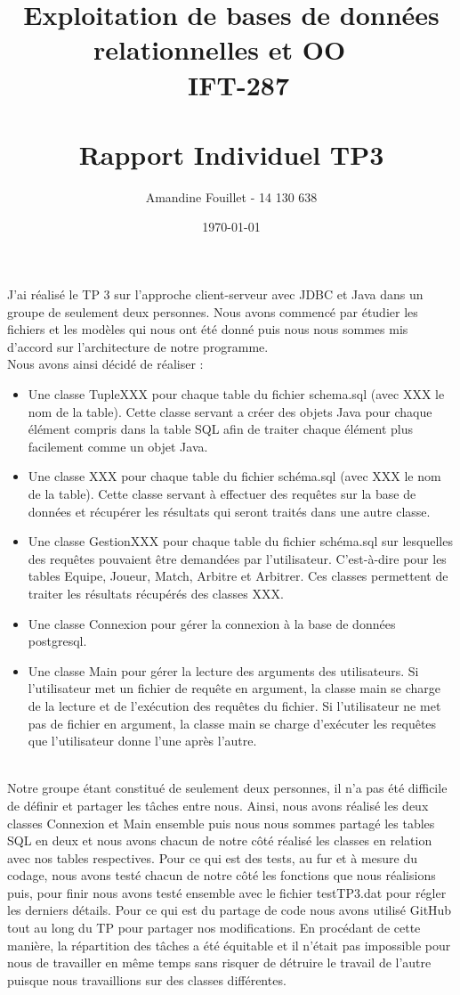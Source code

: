 \documentclass[11pt]{article}
\title{Exploitation de bases de données relationnelles et OO ~\\~\textbf{IFT-287} \\~\\ Rapport Individuel TP3}
\author{Amandine Fouillet - 14 130 638}
\date{\today}
\begin{document}
\maketitle

J'ai réalisé le TP 3 sur l'approche client-serveur avec JDBC et Java dans un groupe de seulement deux personnes. 
Nous avons commencé par étudier les fichiers et les modèles qui nous ont été donné puis nous nous sommes mis d'accord sur l'architecture de notre programme. ~\\
Nous avons ainsi décidé de réaliser : 
\begin{itemize}
\item Une classe TupleXXX pour chaque table du fichier schema.sql (avec XXX le nom de la table). Cette classe servant a créer des objets Java pour chaque élément compris dans la table SQL afin de traiter chaque élément plus facilement comme un objet Java. 
\item Une classe XXX pour chaque table du fichier schéma.sql (avec XXX le nom de la table). Cette classe servant à effectuer des requêtes sur la base de données et récupérer les résultats qui seront traités dans une autre classe.
\item Une classe GestionXXX pour chaque table du fichier schéma.sql sur lesquelles des requêtes pouvaient être demandées par l'utilisateur. C'est-à-dire pour les tables Equipe, Joueur, Match, Arbitre et Arbitrer. Ces classes permettent de traiter les résultats récupérés des classes XXX.
\item Une classe Connexion pour gérer la connexion à la base de données postgresql.
\item Une classe Main pour gérer la lecture des arguments des utilisateurs. Si l'utilisateur met un fichier de requête en argument, la classe main se charge de la lecture et de l'exécution des requêtes du fichier. Si l'utilisateur ne met pas de fichier en argument, la classe main se charge d'exécuter les requêtes que l'utilisateur donne l'une après l'autre.
\end{itemize}~\\


Notre groupe étant constitué de seulement deux personnes, il n'a pas été difficile de définir et partager les tâches entre nous. Ainsi, nous avons réalisé les deux classes Connexion et Main ensemble puis nous nous sommes partagé les tables SQL en deux et nous avons chacun de notre côté réalisé les classes en relation avec nos tables respectives. Pour ce qui est des tests, au fur et à mesure du codage, nous avons testé chacun de notre côté les fonctions que nous réalisions puis, pour finir nous avons testé ensemble avec le fichier testTP3.dat pour régler les derniers détails. Pour ce qui est du partage de code nous avons utilisé GitHub tout au long du TP pour partager nos modifications. En procédant de cette manière, la répartition des tâches a été équitable et il n'était pas impossible pour nous de travailler en même temps sans risquer de détruire le travail de l'autre puisque nous travaillions sur des classes différentes.~\\
\end{document}
